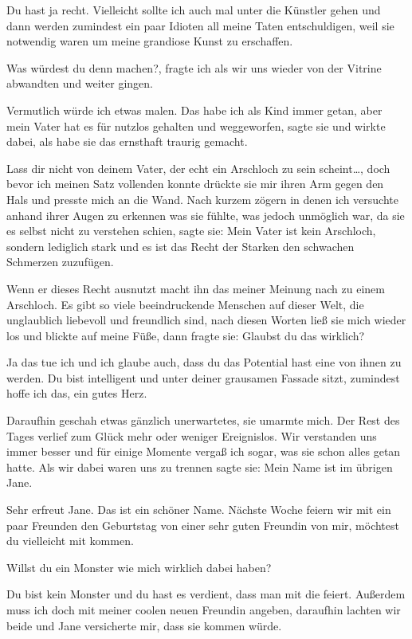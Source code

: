 \documentclass[11pt, a5paper]{article}
\newcommand{\te}{Jane } %
\newcommand{\Te}{Jane} %
\begin{document}
\begin{spacing}{1.2}
		\frqq Du hast ja recht. Vielleicht sollte ich auch mal unter die Künstler gehen und dann werden zumindest ein paar Idioten all meine Taten entschuldigen, weil sie notwendig waren um meine grandiose Kunst zu erschaffen.\flqq
		
		\frqq Was würdest du denn machen?\flqq, fragte ich als wir uns wieder von der Vitrine abwandten und weiter gingen.
		
		\frqq Vermutlich würde ich etwas malen. Das habe ich als Kind immer getan, aber mein Vater hat es für nutzlos gehalten und weggeworfen\flqq, sagte sie und wirkte dabei, als habe sie das ernsthaft traurig gemacht.
		
		\frqq Lass dir nicht von deinem Vater, der echt ein Arschloch zu sein scheint…\flqq , doch bevor ich meinen Satz vollenden konnte drückte sie mir ihren Arm gegen den Hals und presste mich an die Wand. Nach kurzem zögern in denen ich versuchte anhand ihrer Augen zu erkennen was sie fühlte, was jedoch unmöglich war, da sie es selbst nicht zu verstehen schien, sagte sie: \frqq Mein Vater ist kein Arschloch, sondern lediglich stark und es ist das Recht der Starken den schwachen Schmerzen zuzufügen.\flqq
		
		\frqq Wenn er dieses Recht ausnutzt macht ihn das meiner Meinung nach zu einem Arschloch. Es gibt so viele beeindruckende Menschen auf dieser Welt, die unglaublich liebevoll und freundlich sind\flqq, nach diesen Worten ließ sie mich wieder los und blickte auf meine Füße, dann fragte sie: \frqq Glaubst du das wirklich?\flqq
		
		\frqq Ja das tue ich und ich glaube auch, dass du das Potential hast eine von ihnen zu werden. Du bist intelligent und unter deiner grausamen Fassade sitzt, zumindest hoffe ich das, ein gutes Herz.\flqq
		
		Daraufhin geschah etwas gänzlich unerwartetes, sie umarmte mich. Der Rest des Tages verlief zum Glück mehr oder weniger Ereignislos. Wir verstanden uns immer besser und für einige Momente vergaß ich sogar, was sie schon alles getan hatte. Als wir dabei waren uns zu trennen sagte sie: \frqq Mein Name ist im übrigen \Te .\flqq
		
		\frqq Sehr erfreut \Te . Das ist ein schöner Name. Nächste Woche feiern wir mit ein paar Freunden den Geburtstag von einer sehr guten Freundin von mir, möchtest du vielleicht mit kommen.\flqq
		
		\frqq Willst du ein Monster wie mich wirklich dabei haben?\flqq
		
		\frqq Du bist kein Monster und du hast es verdient, dass man mit die feiert. Außerdem muss ich doch mit meiner coolen neuen Freundin angeben\flqq , daraufhin lachten wir beide und \te versicherte mir, dass sie kommen würde.\newpage
		

\end{spacing}
\end{document}
